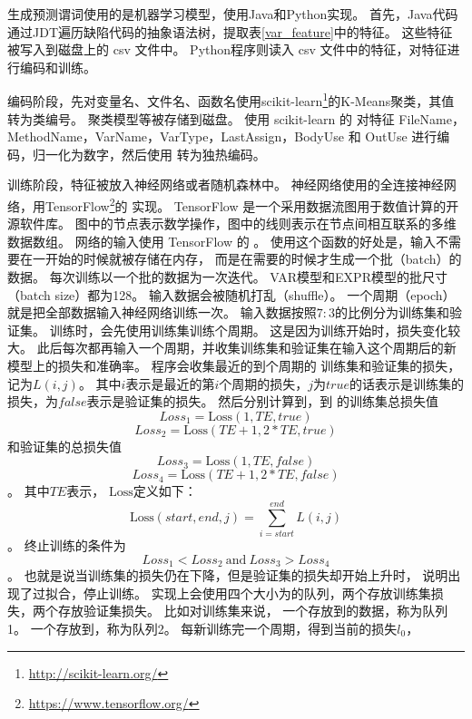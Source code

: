 生成预测谓词使用的是机器学习模型，使用Java和Python实现。
首先，Java代码通过JDT遍历缺陷代码的抽象语法树，提取表\ref{var_feature}中的特征。
这些特征被写入到磁盘上的 csv 文件中。
Python程序则读入 csv 文件中的特征，对特征进行编码和训练。

编码阶段，先对变量名、文件名、函数名使用scikit-learn\footnote{\url{http://scikit-learn.org/}}的K-Means聚类，其值转为类编号。
聚类模型等被存储到磁盘。
使用 scikit-learn 的  对特征 FileName，MethodName，VarName，VarType，LastAssign，BodyUse
和 OutUse 进行编码，归一化为数字，然后使用  转为独热编码。

训练阶段，特征被放入神经网络或者随机森林中。
神经网络使用的全连接神经网络，用TensorFlow\footnote{\url{https://www.tensorflow.org/}}的  实现。
TensorFlow 是一个采用数据流图用于数值计算的开源软件库。
图中的节点表示数学操作，图中的线则表示在节点间相互联系的多维数据数组。
网络的输入使用 TensorFlow 的 。
使用这个函数的好处是，输入不需要在一开始的时候就被存储在内存，
而是在需要的时候才生成一个批（batch）的数据。
每次训练以一个批的数据为一次迭代。
VAR模型和EXPR模型的批尺寸（batch size）都为128。
输入数据会被随机打乱（shuffle）。
一个周期（epoch）就是把全部数据输入神经网络训练一次。
输入数据按照$7:3$的比例分为训练集和验证集。
训练时，会先使用训练集训练个周期。
这是因为训练开始时，损失变化较大。
此后每次都再输入一个周期，并收集训练集和验证集在输入这个周期后的新模型上的损失和准确率。
程序会收集最近的到个周期的
训练集和验证集的损失，记为$L(i, j)$。
其中$i$表示是最近的第$i$个周期的损失，$j$为$true$的话表示是训练集的损失，为$false$表示是验证集的损失。
然后分别计算到，到
的训练集总损失值
$$
Loss_1 = \mathrm{Loss}(1, TE, true)
$$
$$
Loss_2 = \mathrm{Loss}(TE + 1, 2 * TE, true)
$$
和验证集的总损失值
$$
Loss_3 = \mathrm{Loss}(1, TE, false)
$$
$$
Loss_4 = \mathrm{Loss}(TE + 1, 2 * TE, false)
$$。
其中$TE$表示，
$\mathrm{Loss}$定义如下：
$$
\mathrm{Loss}(start, end, j) = \sum_{i=start}^{end}{L(i, j)}
$$。
终止训练的条件为
$$
Loss_1 < Loss_2 \ \mathrm{and} \ Loss_3 > Loss_4
$$。
也就是说当训练集的损失仍在下降，但是验证集的损失却开始上升时，
说明出现了过拟合，停止训练。
实现上会使用四个大小为的队列，两个存放训练集损失，两个存放验证集损失。
比如对训练集来说，
一个存放到的数据，称为队列1。
一个存放到，称为队列2。
每新训练完一个周期，得到当前的损失$l_0$，
